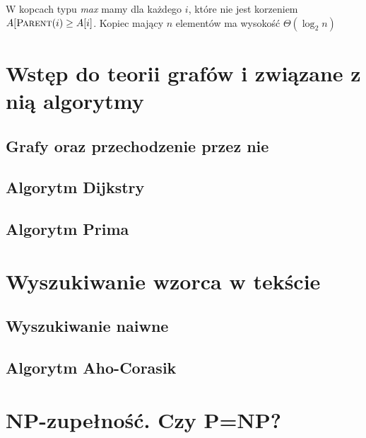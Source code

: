 \documentclass[10pt, oneside]{article}
\theoremstyle{remark}
\begin{document}
W kopcach typu \emph{max} mamy dla każdego $i$, które nie jest korzeniem $A[\Call{Parent}{i} \geq A[i]$. Kopiec mający $n$ elementów ma wysokość $\Theta (\log_2 n)$


\section{Wstęp do teorii grafów i związane z nią algorytmy}
\subsection{Grafy oraz przechodzenie przez nie}
\subsection{Algorytm Dijkstry}
\subsection{Algorytm Prima}

\section{Wyszukiwanie wzorca w tekście}

\subsection{Wyszukiwanie naiwne}

\subsection{Algorytm Aho-Corasik}

\section{NP-zupełność. Czy P=NP?}
\end{document}

